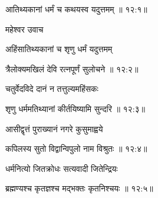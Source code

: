
{\devanagarifont आतिथ्यकानां धर्मं च कथयस्व यदुत्तमम् {॥ १२:१॥} \veg\dontdisplaylinenum }%

{\devanagarifont महेश्वर उवाच {\dandab}\dontdisplaylinenum  }%

{\devanagarifont अहिंसातिथ्यकानां च शृणु धर्मं यदुत्तमम् \thinspace{\danda} \dontdisplaylinenum }%


{\devanagarifont त्रैलोक्यमखिलं देवि रत्नपूर्णं सुलोचने {॥ १२:२॥} \veg\dontdisplaylinenum }%

{\devanagarifont चतुर्वेदविदे दानं न तत्तुल्यमहिंसकः \thinspace{\dandab} \dontdisplaylinenum }%


{\devanagarifont शृणु धर्ममतिथ्यानां कीर्तयिष्यामि सुन्दरि {॥ १२:३॥} \veg\dontdisplaylinenum }%
 

{\devanagarifont आसीद्वृत्तं पुराख्यानं नगरे कुसुमाह्वये \thinspace{\dandab} \dontdisplaylinenum }%


{\devanagarifont कपिलस्य सुतो विद्वान्विपुलो नाम विश्रुतः {॥ १२:४॥} \veg\dontdisplaylinenum }%
 
{\devanagarifont धर्मनित्यो जितक्रोधः सत्यवादी जितेन्द्रियः \thinspace{\dandab} \dontdisplaylinenum }%


{\devanagarifont ब्रह्मण्यश्च कृतज्ञश्च मद्भक्तः कृतनिश्चयः {॥ १२:५॥} \veg\dontdisplaylinenum }%

